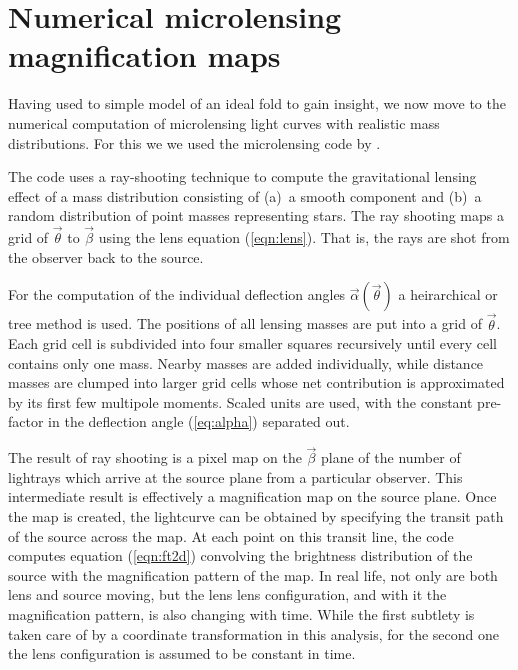 \section{Numerical microlensing magnification maps}

Having used to simple model of an ideal fold to gain insight, we now
move to the numerical computation of microlensing light curves with
realistic mass distributions.  For this we we used the microlensing
code by \cite{1999A&A...346L...5W}.

The code uses a ray-shooting technique to compute the gravitational
lensing effect of a mass distribution consisting of (a)~a smooth
component and (b)~a random distribution of point masses representing
stars.  The ray shooting maps a grid of $\vec\theta$ to $\vec\beta$
using the lens equation (\ref{eqn:lens}).  That is, the rays are shot
from the observer back to the source.

For the computation of the individual deflection angles
$\vec\alpha(\vec\theta)$ a heirarchical or tree method is used.  The
positions of all lensing masses are put into a grid of $\vec\theta$.
Each grid cell is subdivided into four smaller squares recursively
until every cell contains only one mass.  Nearby masses are added
individually, while distance masses are clumped into larger grid cells
whose net contribution is approximated by its first few multipole
moments.  Scaled units are used, with the constant pre-factor in the
deflection angle (\ref{eq:alpha}) separated out.

The result of ray shooting is a pixel map on the $\vec\beta$ plane of
the number of lightrays which arrive at the source plane from a
particular observer.  This intermediate result is effectively a
magnification map on the source plane.  Once the map is created, the
lightcurve can be obtained by specifying the transit path of the
source across the map.  At each point on this transit line, the code
computes equation (\ref{eqn:ft2d}) convolving the brightness
distribution of the source with the magnification pattern of the map.
In real life, not only are both lens and source moving, but the lens
lens configuration, and with it the magnification pattern, is also
changing with time.  While the first subtlety is taken care of by a
coordinate transformation in this analysis, for the second one the
lens configuration is assumed to be constant in time.

